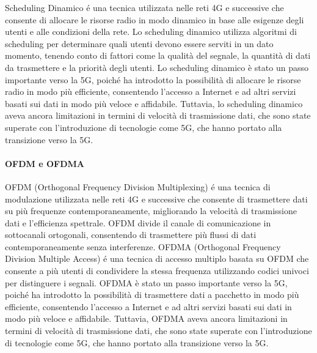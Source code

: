 Scheduling Dinamico é una tecnica utilizzata nelle reti 4G e successive che consente di allocare le risorse radio in modo dinamico in base alle esigenze degli utenti e alle condizioni della rete. Lo scheduling dinamico utilizza algoritmi di scheduling per determinare quali utenti devono essere serviti in un dato momento, tenendo conto di fattori come la qualità del segnale, la quantità di dati da trasmettere e la priorità degli utenti. Lo scheduling dinamico è stato un passo importante verso la 5G, poiché ha introdotto la possibilità di allocare le risorse radio in modo più efficiente, consentendo l'accesso a Internet e ad altri servizi basati sui dati in modo più veloce e affidabile. Tuttavia, lo scheduling dinamico aveva ancora limitazioni in termini di velocità di trasmissione dati, che sono state superate con l'introduzione di tecnologie come 5G, che hanno portato alla transizione verso la 5G.\\
\paragraph{OFDM e OFDMA}
OFDM (Orthogonal Frequency Division Multiplexing) é una tecnica di modulazione utilizzata nelle reti 4G e successive che consente di trasmettere dati su più frequenze contemporaneamente, migliorando la velocità di trasmissione dati e l'efficienza spettrale. OFDM divide il canale di comunicazione in sottocanali ortogonali, consentendo di trasmettere più flussi di dati contemporaneamente senza interferenze. OFDMA (Orthogonal Frequency Division Multiple Access) é una tecnica di accesso multiplo basata su OFDM che consente a più utenti di condividere la stessa frequenza utilizzando codici univoci per distinguere i segnali. OFDMA è stato un passo importante verso la 5G, poiché ha introdotto la possibilità di trasmettere dati a pacchetto in modo più efficiente, consentendo l'accesso a Internet e ad altri servizi basati sui dati in modo più veloce e affidabile. Tuttavia, OFDMA aveva ancora limitazioni in termini di velocità di trasmissione dati, che sono state superate con l'introduzione di tecnologie come 5G, che hanno portato alla transizione verso la 5G.\\

